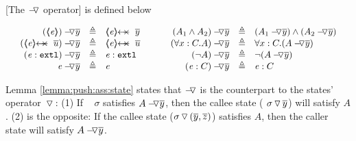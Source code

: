 \begin{definition}
\label{def:push}
[The $\pushSymbolAA$  operator] is  defined below

$
\begin{array}{c}
\begin{array}{l}
\begin{array}{rclcrcl}
  \PushAS y {(\inside \re)} & \triangleq &  \protectedFrom \re {\overline {y} }
  & \ \ \  \ &
  \PushAS y   {(A_1  \wedge  A_2)} & \triangleq &  (\PushAS y  { A_1})  \wedge  ( \PushAS y  {A_2} )  
\\ 
 \PushAS y {(\protectedFrom \re {\overline {u}})} &  \triangleq& \protectedFrom \re {\overline {u}} 
  & &
 \PushAS y  {(\forall x:C.A)} & \triangleq & \forall x:C.({\PushAS y A} )  
  \\  
  \PushAS y  {(\external \re)} &  \triangleq & {\external \re}  %
  & & 
  \PushAS y  {(\neg A)} &  \triangleq & \neg( {\PushAS y A} )  
    \\
     \PushAS y  {\re} &  \triangleq&   \re %
    & &
    \PushAS y  {(\re:C)} &  \triangleq&   \re:C 
 \end{array}
\end{array}
\end{array}
$
\label{f:Push}
\end{definition}

 


\newcommand{\sigmas}{\widetilde \sigma}



\vspace{.1cm}

 Lemma \ref{lemma:push:ass:state}  states that $\pushSymbolAA$ is the counterpart to the states' operator $\pushSymbol$:
 (1) If \ %
$\sigma$ satisfies  $\PushAS y A$, then  the callee state  ($\PushS {y} {\sigma}$) %
will satisfy $A$. %
(2) is the opposite: {If the callee state ($\PushSLong {(\overline y, \overline z)} {\sigma}$) %
 satisfies $A$, then the caller state will satisfy 
$\PushAS {y} {A}$. } %


